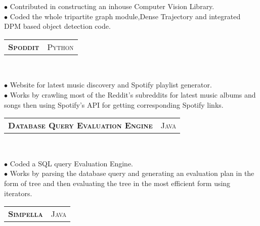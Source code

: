 \documentclass[10pt,a4paper,oneside]{article}
\begin{document}
\begin{minipage}[t]{0.63\textwidth}
        \begin{adjustwidth}{7pt}{0pt}
            {\footnotesize $\bullet$ Contributed in constructing an inhouse
            Computer Vision Library.\\
            $\bullet$ Coded the whole tripartite graph module,Dense
            Trajectory and integrated DPM based object detection code.}\\
        \end{adjustwidth}
        \begin{tabular}{c|c}
            \textbf{\normalsize S\textsc{poddit}}
            &\textmd{\normalsize P\textsc{ython}}
        \end{tabular}\\
         \vspace{-4mm}
        \begin{adjustwidth}{7pt}{0pt}
            {\footnotesize $\bullet$ Website for latest music
            discovery and Spotify playlist generator.\\
            $\bullet$ Works by crawling most of the Reddit's subreddits for
            latest music albums and songs then using Spotify's API for
            getting corresponding Spotify links.}\\
        \end{adjustwidth}
        \begin{tabular}{c|c}
            \textbf{\normalsize D\textsc{atabase} Q\textsc{uery}
            E\textsc{valuation} E\textsc{ngine}}
            &\textmd{\normalsize J\textsc{ava}}
        \end{tabular}\\
         \vspace{-4mm}
        \begin{adjustwidth}{7pt}{0pt}
            {\footnotesize $\bullet$ Coded a SQL query Evaluation Engine.\\
            $\bullet$ Works by parsing the database query and generating an evaluation plan in the form of tree and then evaluating the tree in the most efficient form using iterators.}\\
        \end{adjustwidth}
        \begin{tabular}{c|c}
            \textbf{\normalsize S\textsc{impella}}
            &\textmd{\normalsize J\textsc{ava}}
        \end{tabular}\\
         \vspace{-4mm}
        \begin{adjustwidth}{7pt}{0pt}

\end{adjustwidth}
\end{minipage}
\end{document}
